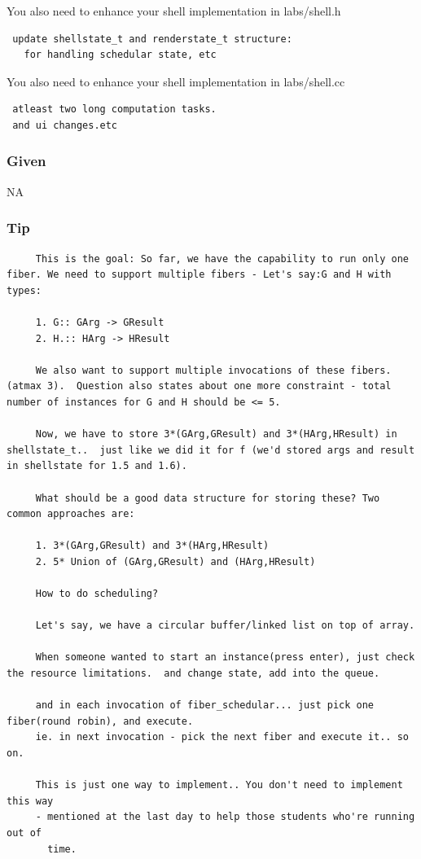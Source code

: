 \documentclass[]{book}
\begin{document}
You also need to enhance your shell implementation in labs/shell.h

\begin{verbatim}
 update shellstate_t and renderstate_t structure:
   for handling schedular state, etc
\end{verbatim}

You also need to enhance your shell implementation in labs/shell.cc

\begin{verbatim}
 atleast two long computation tasks.
 and ui changes.etc
\end{verbatim}

\subsubsection*{Given}\label{given-6}

NA

\subsubsection*{Tip}\label{tip-6}

\begin{verbatim}
     This is the goal: So far, we have the capability to run only one fiber. We need to support multiple fibers - Let's say:G and H with types:

     1. G:: GArg -> GResult
     2. H.:: HArg -> HResult

     We also want to support multiple invocations of these fibers. (atmax 3).  Question also states about one more constraint - total number of instances for G and H should be <= 5.

     Now, we have to store 3*(GArg,GResult) and 3*(HArg,HResult) in shellstate_t..  just like we did it for f (we'd stored args and result in shellstate for 1.5 and 1.6).

     What should be a good data structure for storing these? Two common approaches are:

     1. 3*(GArg,GResult) and 3*(HArg,HResult)
     2. 5* Union of (GArg,GResult) and (HArg,HResult)

     How to do scheduling?

     Let's say, we have a circular buffer/linked list on top of array.

     When someone wanted to start an instance(press enter), just check the resource limitations.  and change state, add into the queue.

     and in each invocation of fiber_schedular... just pick one fiber(round robin), and execute.
     ie. in next invocation - pick the next fiber and execute it.. so on.

     This is just one way to implement.. You don't need to implement this way
     - mentioned at the last day to help those students who're running out of
       time.
\end{verbatim}
\end{document}
